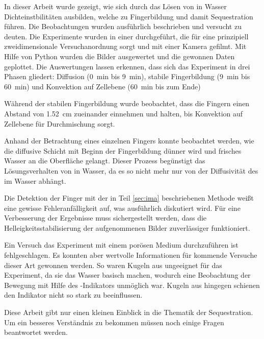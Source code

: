 
\label{cha:con}

In dieser Arbeit wurde gezeigt, wie sich durch das Lösen von \COT in Wasser Dichteinstbilitäten ausbilden, welche zu Fingerbildung und damit \COTm Sequestration führen. Die Beobachtungen wurden ausführlich beschrieben und versucht zu deuten.
Die Experimente wurden in einer \HSC durchgeführt, die für eine prinzipiell zweidimensionale Versuchanordnung sorgt und mit einer Kamera gefilmt.
Mit Hilfe von Python wurden die Bilder ausgewertet und die gewonnen Daten geplottet.
Die Auswertungen lassen erkennen, dass sich das Experiment in drei Phasen gliedert: 
 Diffusion (\SI{0}{\minute} bis \SI{9}{\minute}),
 stabile Fingerbildung (\SI{9}{\minute} bis \SI{60}{\minute}) und
 Konvektion auf Zellebene (\SI{60}{\minute} bis zum Ende) 

Während der stabilen Fingerbildung wurde beobachtet, dass die Fingern einen Abstand von \SI[round-precision=2]{1.52}{\centi\meter} zueinander einnehmen und halten, bis Konvektion auf Zellebene für Durchmischung sorgt.

Anhand der Betrachtung eines einzelnen Fingers konnte beobachtet werden, wie die diffusive Schicht mit Beginn der Fingerbildung dünner wird und frisches Wasser an die Oberfläche gelangt. Dieser Prozess begünstigt das Lösungsverhalten von \COT in Wasser, da es so nicht mehr nur von der Diffusivität des \COT im Wasser abhängt. 

Die Detektion der Finger mit der in Teil \ref{sec:ima} beschriebenen Methode weißt eine gewisse Fehleranfälligkeit auf, was ausführlich diskutiert wird. Für eine Verbesserung der Ergebnisse muss sichergestellt werden, dass die Helleigkeitsstabilisierung der aufgenommenen Bilder zuverlässiger funktioniert. 


Ein Versuch das Experiment mit einem porösen Medium durchzuführen ist fehlgeschlagen. Es konnten aber wertvolle Informationen für kommende Versuche dieser Art gewonnen werden. So waren Kugeln aus \KNG ungeeignet für das Experiment, da sie das Wasser basisch machen, wodurch eine Beobachtung der \COT Bewegung mit Hilfe des \BCG-Indikators unmöglich war. Kugeln aus \BOG hingegen schienen den Indikator nicht so stark zu beeinflussen.


Diese Arbeit gibt nur einen kleinen Einblick in die Thematik der \COTm Sequestration. Um ein besseres Verständnis zu bekommen müssen noch einige Fragen beantwortet werden. 

